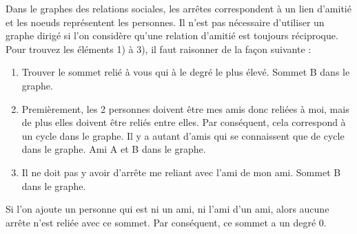 \begin{Exercice}[10 minutes]
    \begin{solution}
        Dans le graphes des relations sociales, les arrêtes correspondent à un lien d'amitié et les noeuds représentent les personnes. Il n'est pas nécessaire d'utiliser un graphe dirigé si l'on considère qu'une relation d'amitié est toujours réciproque.\\
        
        Pour trouvez les éléments 1) à 3), il faut raisonner de la façon suivante :
        \begin{enumerate}
            \item Trouver le sommet relié à vous qui à le degré le plus élevé. Sommet B dans le graphe.
            \item Premièrement, les 2 personnes doivent être mes amis donc reliées à moi, mais de  plus elles doivent être reliés entre elles. Par conséquent, cela correspond à un cycle dans le graphe. Il y a autant d'amis qui se connaissent que de cycle dans le graphe. Ami A et B dans le graphe.
            \item Il ne doit pas y avoir d'arrête me reliant avec l'ami de mon ami. Sommet B dans le graphe.
        \end{enumerate}
        
        Si l'on ajoute un personne qui est ni un ami, ni l'ami d'un ami, alors aucune arrête n'est reliée avec ce sommet. Par conséquent, ce sommet a un degré 0.
    \end{solution} 
\end{Exercice}
